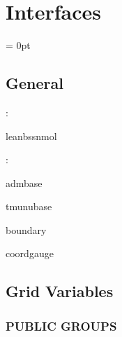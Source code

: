 
\section{Interfaces} 


\parskip = 0pt

\vspace{3mm} \subsection*{General}

: 

leanbssnmol
\vspace{2mm}

: 

admbase

tmunubase

boundary

coordgauge
\vspace{2mm}
\subsection*{Grid Variables}
\vspace{5mm}\subsubsection{PUBLIC GROUPS}

\vspace{5mm}

